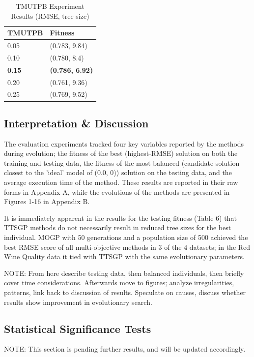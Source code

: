 \documentclass[a4paper, twocolumn]{article}
\begin{document}
\begin{table}[H]
	\begin{center}
		\caption{TMUTPB Experiment Results (RMSE, tree size)}
		\label{table:Z}
		\begin{tabularx}{\columnwidth}{X|X}
			TMUTPB&Fitness\\
			\hline
			0.05&(0.783, 9.84)\\
			0.10&(0.780, 8.4)\\
			\textbf{0.15}&\textbf{(0.786, 6.92)}\\
			0.20&(0.761, 9.36)\\
			0.25&(0.769, 9.52)\\
		\end{tabularx}
	\end{center}
\end{table}

\subsection{Interpretation \& Discussion}
The evaluation experiments tracked four key variables reported by the methods during evolution; the fitness of the best (highest-RMSE) solution on both the training and testing data, the fitness of the most balanced (candidate solution closest to the 'ideal' model of (0.0, 0)) solution on the testing data, and the average execution time of the method. These results are reported in their raw forms in Appendix A, while the evolutions of the methods are presented in Figures 1-16 in Appendix B.

It is immediately apparent in the results for the testing fitness (Table 6) that TTSGP methods do not necessarily result in reduced tree sizes for the best individual. MOGP with 50 generations and a population size of 500 achieved the best RMSE score of all multi-objective methods in 3 of the 4 datasets; in the Red Wine Quality data it tied with TTSGP with the same evolutionary parameters. 

NOTE: From here describe testing data, then balanced individuals, then briefly cover time considerations. Afterwards move to figures; analyze irregularities, patterns, link back to discussion of results. Speculate on causes, discuss whether results show improvement in evolutionary search.

\subsection{Statistical Significance Tests}
NOTE: This section is pending further results, and will be updated accordingly.
\end{document}

